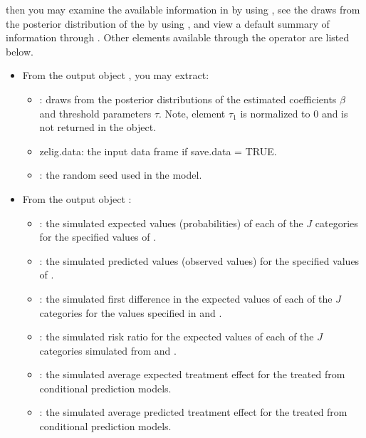 \documentclass[letterpaper,10pt,english]{sphinxmanual}
\begin{document}
then you may examine the available information in  by using
, see the draws from the posterior distribution of the
 by using , and view a default
summary of information through . Other elements
available through the \code{\$} operator are listed below.
\begin{itemize}
\item {} 
From the  output object , you may extract:
\begin{itemize}
\item {} 
: draws from the posterior distributions of the
estimated coefficients \(\beta\) and threshold parameters
\(\tau\). Note, element \(\tau_1\) is normalized to 0 and
is not returned in the  object.

\item {} 
zelig.data: the input data frame if save.data = TRUE.

\item {} 
: the random seed used in the model.

\end{itemize}

\item {} 
From the  output object :
\begin{itemize}
\item {} 
: the simulated expected values (probabilities) of each
of the \(J\) categories for the specified values of .

\item {} 
: the simulated predicted values (observed values) for
the specified values of .

\item {} 
: the simulated first difference in the expected values
of each of the \(J\) categories for the values specified in
 and .

\item {} 
: the simulated risk ratio for the expected values of
each of the \(J\) categories simulated from  and .

\item {} 
: the simulated average expected treatment effect for
the treated from conditional prediction models.

\item {} 
: the simulated average predicted treatment effect
for the treated from conditional prediction models.

\end{itemize}

\end{itemize}
\end{document}
